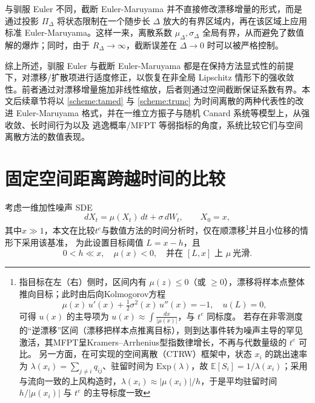 	与驯服 Euler 不同，截断 Euler-Maruyama 并不直接修改漂移增量的形式，而是通过投影 $\Pi_\Delta$ 将状态限制在一个随步长 $\Delta$ 放大的有界区域内，再在该区域上应用标准 Euler-Maruyama。这样一来，离散系数 $\mu_\Delta,\sigma_\Delta$ 全局有界，从而避免了数值解的爆炸；同时，由于 $R_\Delta\to\infty$，截断误差在 $\Delta\to0$ 时可以被严格控制。
	
	\medskip
	
	综上所述，驯服 Euler 与截断 Euler-Maruyama 都是在保持方法显式性的前提下，对漂移/扩散项进行适度修正，以恢复在非全局 Lipschitz 情形下的强收敛性。前者通过对漂移增量施加非线性缩放，后者则通过空间截断保证系数有界。本文后续章节将以 \eqref{scheme:tamed} 与 \eqref{scheme:trunc} 为时间离散的两种代表性的改进 Euler-Maruyama 格式，并在一维立方振子与随机 Canard 系统等模型上，从强收敛、长时间行为以及 逃逸概率/MFPT 等弱指标的角度，系统比较它们与空间离散方法的数值表现。
	
	
	\newpage
	
\section{固定空间距离跨越时间的比较}



考虑一维加性噪声 SDE
\begin{equation}\label{eq:sde-time-mfpt}
	dX_t=\mu(X_t)\,dt+\sigma\,dW_t,\qquad X_0=x,
\end{equation}
其中$x\gg 1$，本文在比较$t^e$与数值方法的时间分析时，仅在顺漂移\footnote{指目标在左（右）侧时，区间内有 $\mu(z)\le0$（或 $\ge0$），漂移将样本点整体推向目标；此时由后向Kolmogorov方程
	\[
	\mu(x)\,u'(x)+\tfrac12\sigma^2(x)\,u''(x)=-1,\quad u(L)=0,
	\]
可得 $u(x)$ 的主导项为 $u(x)\approx\int\frac{dx}{|\mu(x)|}$，与 $t^e$ 同标度。 若存在非零测度的“逆漂移”区间（漂移把样本点推离目标），则到达事件转为噪声主导的罕见激活，其MFPT呈Kramers–Arrhenius型指数律增长，不再与代数量级的 $t^e$ 可比\cite{Hanggi1990ReactionRateKramers}。 另一方面，在可实现的空间离散（CTRW）框架中，状态 $x_i$ 的跳出速率为 $\lambda(x_i)=\sum_{j\ne i}q_{ij}$、驻留时间为 $\mathrm{Exp}(\lambda)$，故 $\mathbb E[S_i]=1/\lambda(x_i)$；采用与流向一致的上风构造时，$\lambda(x_i)\approx|\mu(x_i)|/h$，于是平均驻留时间 $h/|\mu(x_i)|$ 与 $t^e$ 的主导标度一致\cite{bou2018continuous}}并且小位移的情形下采用该基准，%
为此设置目标阈值 $L=x-h$，且
\begin{equation}\label{eq:assum-local}
	0< h \ll x,\quad \mu(x)<0,\quad \text{并在 }[L,x]\text{ 上 }\mu\ \text{光滑}.
\end{equation}


